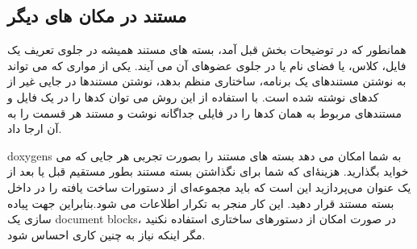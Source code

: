 \subsection{مستند در مکان های دیگر}

همانطور که در توضیحات بخش قبل آمد، بسته های مستند همیشه در جلوی تعریف یک فایل،
کلاس، یا فضای نام یا در جلوی عضوهای آن می آیند.
یکی از مواری که می تواند به نوشتن مستندهای یک برنامه، ساختاری منظم بدهد، نوشتن
مستندها در جایی غیر از کدهای نوشته شده است. با استفاده از این روش می توان کدها
را در یک فایل و مستندهای مربوط به همان کدها را در فایلی جداگانه نوشت و مستند هر
قسمت را به آن ارجا داد.

\glspl{doxygen} به شما امکان می دهد بسته های مستند را بصورت تجربی هر جایی که می
خواید بگذارید. هزینه‌ٔای که شما برای نگذاشتن بسته مستند بطور مستقیم قبل یا بعد
از یک عنوان می‌پردازید این است که باید مجموعه‌ای از دستورات ساخت یافته را در داخل بسته مستند
قرار دهید. این کار منجر به تکرار اطلاعات می شود.بنابراین جهت پیاده سازی یک
\glspl{document block}، در صورت امکان از دستورهای ساختاری استفاده نکنید مگر
اینکه نیاز به چنین کاری احساس شود.
